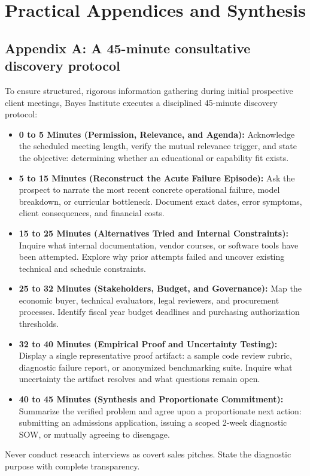 \section*{Practical Appendices and Synthesis}

\subsection*{Appendix A: A 45-minute consultative discovery protocol}

To ensure structured, rigorous information gathering during initial prospective client meetings, Bayes Institute executes a disciplined 45-minute discovery protocol:
\begin{itemize}
\item \textbf{0 to 5 Minutes (Permission, Relevance, and Agenda):} Acknowledge the scheduled meeting length, verify the mutual relevance trigger, and state the objective: determining whether an educational or capability fit exists.
\item \textbf{5 to 15 Minutes (Reconstruct the Acute Failure Episode):} Ask the prospect to narrate the most recent concrete operational failure, model breakdown, or curricular bottleneck. Document exact dates, error symptoms, client consequences, and financial costs.
\item \textbf{15 to 25 Minutes (Alternatives Tried and Internal Constraints):} Inquire what internal documentation, vendor courses, or software tools have been attempted. Explore why prior attempts failed and uncover existing technical and schedule constraints.
\item \textbf{25 to 32 Minutes (Stakeholders, Budget, and Governance):} Map the economic buyer, technical evaluators, legal reviewers, and procurement processes. Identify fiscal year budget deadlines and purchasing authorization thresholds.
\item \textbf{32 to 40 Minutes (Empirical Proof and Uncertainty Testing):} Display a single representative proof artifact: a sample code review rubric, diagnostic failure report, or anonymized benchmarking suite. Inquire what uncertainty the artifact resolves and what questions remain open.
\item \textbf{40 to 45 Minutes (Synthesis and Proportionate Commitment):} Summarize the verified problem and agree upon a proportionate next action: submitting an admissions application, issuing a scoped 2-week diagnostic SOW, or mutually agreeing to disengage.
\end{itemize}
Never conduct research interviews as covert sales pitches. State the diagnostic purpose with complete transparency.

